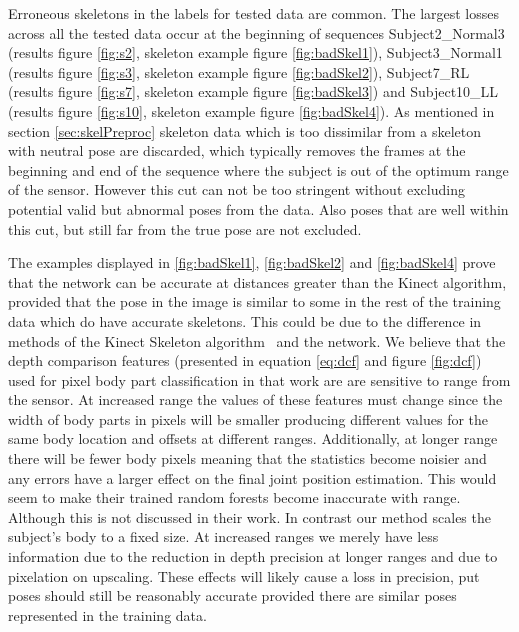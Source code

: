 \documentclass[11pt]{article} %
\begin{document}
Erroneous skeletons in the labels for tested data are common. The largest losses across all the tested data occur at the beginning of sequences Subject2\_Normal3 (results figure \ref{fig:s2}, skeleton example figure \ref{fig:badSkel1}), Subject3\_Normal1 (results figure \ref{fig:s3}, skeleton example figure \ref{fig:badSkel2}), Subject7\_RL (results figure \ref{fig:s7}, skeleton example figure \ref{fig:badSkel3}) and Subject10\_LL (results figure \ref{fig:s10}, skeleton example figure \ref{fig:badSkel4}). As mentioned in section \ref{sec:skelPreproc} skeleton data which is too dissimilar from a skeleton with neutral pose are discarded, which typically removes the frames at the beginning and end of the sequence where the subject is out of the optimum range of the sensor. However this cut can not be too stringent without excluding potential valid but abnormal poses from the data. Also poses that are well within this cut, but still far from the true pose are not excluded. 

The examples displayed in \ref{fig:badSkel1}, \ref{fig:badSkel2} and \ref{fig:badSkel4} prove that the network can be accurate at distances greater than the Kinect algorithm, provided that the pose in the image is similar to some in the rest of the training data which do have accurate skeletons. This could be due to the difference in methods of the Kinect Skeleton algorithm~\cite{Shotton2012} and the network. We believe that the depth comparison features (presented in equation \ref{eq:dcf} and figure \ref{fig:dcf}) used for pixel body part classification in that work are are sensitive to range from the sensor. At increased range the values of these features must change since the width of body parts in pixels will be smaller producing different values for the same body location and offsets at different ranges. Additionally, at longer range there will be fewer body pixels meaning that the statistics become noisier and any errors have a larger effect on the final joint position estimation. This would seem to make their trained random forests become inaccurate with range. Although this is not discussed in their work. In contrast our method scales the subject's body to a fixed size. At increased ranges we merely have less information due to the reduction in depth precision at longer ranges and due to pixelation on upscaling. These effects will likely cause a loss in precision, put poses should still be reasonably accurate provided there are similar poses represented in the training data.
\end{document}
